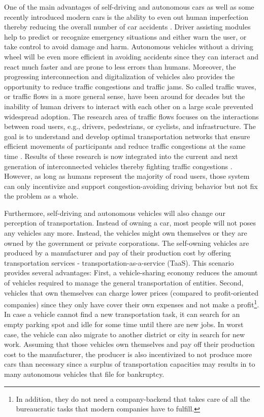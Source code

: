 \documentclass{llncs}
\begin{document}
{		One of the main advantages of self-driving and autonomous cars as well as some recently introduced modern cars is the ability to even out human imperfection thereby reducing the overall number of car accidents \cite{mccall2007driver}\cite{fewerAccidents}. Driver assisting modules help to predict or recognize emergency situations and either warn the user, or take control to avoid damage and harm. Autonomous vehicles without a driving wheel will be even more efficient in avoiding accidents since they can interact and react much faster and are prone to less errors than humans. Moreover, the progressing interconnection and digitalization of vehicles also provides the opportunity to reduce traffic congestions and traffic jams. So called traffic waves, or traffic flows in a more general sense, have been around for decades but the inability of human drivers to interact with each other on a large scale prevented widespread adoption. The research area of traffic flows focuses on the interactions between road users, e.g., drivers, pedestrians, or cyclists, and infrastructure. The goal is to understand and develop optimal transportation networks that ensure efficient movements of participants and reduce traffic congestions at the same time \cite{beaty1998traffic}\cite{whitham1955kinematic}. Results of these research is now integrated into the current and next generation of interconnected vehicles thereby fighting traffic congestions \cite{daganzo2002behavioral}\cite{kesting2008adaptive}\cite{wang2001application}. However, as long as humans represent the majority of road users, those system can only incentivize and support congestion-avoiding driving behavior but not fix the problem as a whole.
		
		Furthermore, self-driving and autonomous vehicles will also change our perception of transportation. Instead of owning a car, most people will not poses any vehicles any more. Instead, the vehicles might own themselves or they are owned by the government or private corporations. The self-owning vehicles are produced by a manufacturer and pay of their production cost by offering transportation services - transportation-as-a-service (TaaS). This scenario provides several advantages: First, a vehicle-sharing economy reduces the amount of vehicles required to manage the general transportation of entities. Second, vehicles that own themselves can charge lower prices (compared to profit-oriented companies) since they only have cover their own expenses and not make a profit\footnote{In addition, they do not need a company-backend that takes care of all the bureaucratic tasks that modern companies have to fulfill.}. In case a vehicle cannot find a new transportation task, it can search for an empty parking spot and idle for some time until there are new jobs. In worst case, the vehicle can also migrate to another district or city in search for new work. Assuming that those vehicles own themselves and pay off their production cost to the manufacturer, the producer is also incentivized to not produce more cars than necessary since a surplus of transportation capacities may results in to many autonomous vehicles that file for bankruptcy.
		
}
\end{document}
